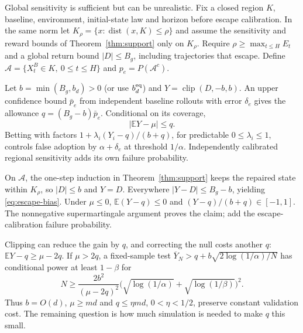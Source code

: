 \documentclass[twocolumn,nameyear]{autart}
\begin{document}
Global sensitivity is sufficient but can be unrealistic. Fix a closed
region $K$, baseline, environment, initial-state law and horizon before
escape calibration. In the same norm let
$K_\rho=\{x:\operatorname{dist}(x,K)\le\rho\}$ and assume the
sensitivity and reward bounds of Theorem~\ref{thm:support} only on
$K_\rho$. Require $\rho\ge\max_{t\le H}E_t$ and a global return
bound $|D|\le B_g$, including trajectories that escape. Define
$\mathcal A=\{X_t^B\in K,\ 0\le t\le H\}$ and
$p_e=P(\mathcal A^c)$.

\begin{prop}\label{prop:regional}
Let $b=\min(B_g,b_d)>0$ (or use $b_d^{\rm eq}$) and
$Y=\operatorname{clip}(D,-b,b)$. An upper confidence bound
$\bar p_e$ from independent baseline rollouts with error $\delta_e$
gives the allowance $q=(B_g-b)\bar p_e$. Conditional on its coverage,
\begin{equation}\label{eq:escape-bias}
 |\mathbb{E} Y-\mu|\le q.
\end{equation}
Betting with factors $1+\lambda_i(Y_i-q)/(b+q)$, for predictable
$0\le\lambda_i\le1$, controls false adoption by
$\alpha+\delta_e$ at threshold $1/\alpha$. Independently calibrated
regional sensitivity adds its own failure probability.
\end{prop}
\begin{pf}
On $\mathcal A$, the one-step induction in Theorem~\ref{thm:support}
keeps the repaired state within $K_\rho$, so $|D|\le b$ and $Y=D$.
Everywhere $|Y-D|\le B_g-b$, yielding \eqref{eq:escape-bias}.
Under $\mu\le0$, $\mathbb{E}(Y-q)\le0$ and $(Y-q)/(b+q)\in[-1,1]$.
The nonnegative supermartingale argument proves the claim; add the
escape-calibration failure probability.
\end{pf}

Clipping can reduce the gain by $q$, and correcting the null costs another
$q$: $\mathbb{E} Y-q\ge\mu-2q$. If $\mu>2q$, a fixed-sample test
$\overline Y_N>q+b\sqrt{2\log(1/\alpha)/N}$ has conditional
power at least $1-\beta$ for
\begin{equation}\label{eq:regional-N}
 N\ge\frac{2b^2}{(\mu-2q)^2}
     \bigl(\sqrt{\log(1/\alpha)}+\sqrt{\log(1/\beta)}\bigr)^2.
\end{equation}
Thus $b=O(d)$, $\mu\ge md$ and $q\le\eta md$, $0<\eta<1/2$,
preserve constant validation cost. The remaining question is how much
simulation is needed to make $q$ this small.
\end{document}
